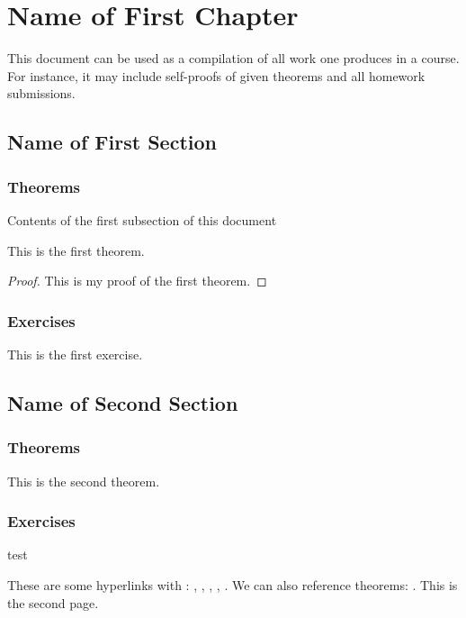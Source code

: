 \documentclass[11pt, a4paper]{book}
\begin{document}
%

%
\tableofcontents
\thispagestyle{empty}
\newpage
\setcounter{page}{1}
%
\chapter{Name of First Chapter}
This document can be used as a compilation of all work one produces in a course. For instance, it may include self-proofs of given theorems and all homework submissions.
%
\section{Name of First Section}
%
\subsection{Theorems}
Contents of the first subsection of this document
\begin{theorem}\label{thm:1.1}
    This is the first theorem.
\end{theorem}
\begin{proof}
    This is my proof of the first theorem.
\end{proof}
%
\subsection{Exercises}
\begin{exercise}\label{ex:1.1}
This is the first exercise.
\end{exercise}
% 
% 
\meaning\theHexercise
\section{Name of Second Section}
\subsection{Theorems}
\begin{theorem}
    This is the second theorem.
\end{theorem}
\subsection{Exercises}
\begin{exercise}\label{ex:1.2}
    test
\end{exercise}
These are some hyperlinks with : , , , , . We can also reference theorems: . 
\newpage
This is the second page.
\end{document}
